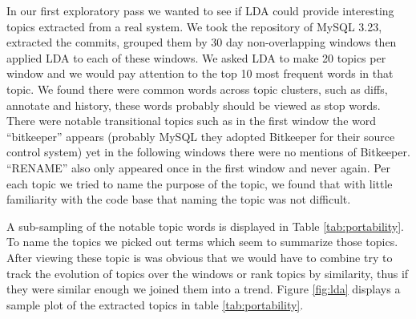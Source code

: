 \documentclass[times, 10pt,twocolumn]{article}
\begin{document}
In our first exploratory pass we wanted to see if LDA could provide
interesting topics extracted from a real system. We took the
repository of MySQL 3.23, extracted the commits, grouped them by 30
day non-overlapping windows then applied LDA to each of these
windows. We asked LDA to make 20 topics per window and we would pay
attention to the top 10 most frequent words in that topic.  We found
there were common words across topic clusters, such as diffs, annotate
and history, these words probably should be viewed as stop
words. There were notable transitional topics such as in the first
window the word ``bitkeeper'' appears (probably MySQL they adopted
Bitkeeper for their source control system) yet in the following
windows there were no mentions of Bitkeeper. ``RENAME'' also only
appeared once in the first window and never again. Per each topic we
tried to name the purpose of the topic, we found that with little
familiarity with the code base that naming the topic was not difficult.

A sub-sampling of the notable topic words is displayed in Table
\ref{tab:portability}.  To name the topics we picked out terms which
seem to summarize those topics.  After viewing these topic is was
obvious that we would have to combine try to track the evolution of
topics over the windows or rank topics by similarity, thus if they
were similar enough we joined them into a trend. Figure \ref{fig:lda}
displays a sample plot of the extracted topics in table
\ref{tab:portability}.


\end{document}
